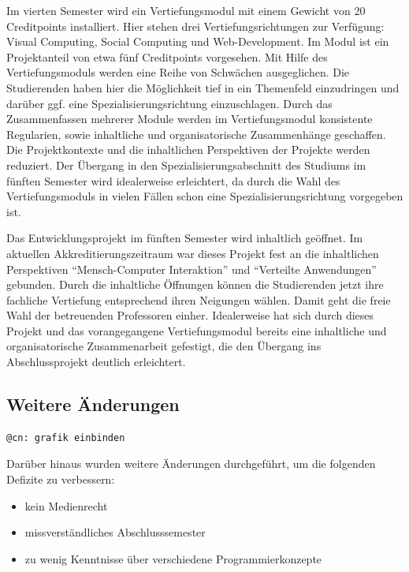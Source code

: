 Im vierten Semester wird ein Vertiefungsmodul mit einem Gewicht von 20
Creditpoints installiert. Hier stehen drei Vertiefungsrichtungen zur
Verfügung: Visual Computing, Social Computing und Web-Development. Im
Modul ist ein Projektanteil von etwa fünf Creditpoints vorgesehen. Mit
Hilfe des Vertiefungsmoduls werden eine Reihe von Schwächen
ausgeglichen. Die Studierenden haben hier die Möglichkeit tief in ein
Themenfeld einzudringen und darüber ggf. eine Spezialisierungsrichtung
einzuschlagen. Durch das Zusammenfassen mehrerer Module werden im
Vertiefungsmodul konsistente Regularien, sowie inhaltliche und
organisatorische Zusammenhänge geschaffen. Die Projektkontexte und die
inhaltlichen Perspektiven der Projekte werden reduziert. Der Übergang in
den Spezialisierungsabschnitt des Studiums im fünften Semester wird
idealerweise erleichtert, da durch die Wahl des Vertiefungsmoduls in
vielen Fällen schon eine Spezialisierungsrichtung vorgegeben ist.

Das Entwicklungsprojekt im fünften Semester wird inhaltlich geöffnet. Im
aktuellen Akkreditierungszeitraum war dieses Projekt fest an die
inhaltlichen Perspektiven ``Mensch-Computer Interaktion'' und
``Verteilte Anwendungen'' gebunden. Durch die inhaltliche Öffnungen
können die Studierenden jetzt ihre fachliche Vertiefung entsprechend
ihren Neigungen wählen. Damit geht die freie Wahl der betreuenden
Professoren einher. Idealerweise hat sich durch dieses Projekt und das
vorangegangene Vertiefungsmodul bereits eine inhaltliche und
organisatorische Zusammenarbeit gefestigt, die den Übergang ins
Abschlussprojekt deutlich erleichtert.

\subsection{Weitere Änderungen}\label{weitere-uxe4nderungen}

\begin{verbatim}
@cn: grafik einbinden
\end{verbatim}

Darüber hinaus wurden weitere Änderungen durchgeführt, um die folgenden
Defizite zu verbessern:

\begin{itemize}
\tightlist
\item
  kein Medienrecht
\item
  missverständliches Abschlusssemester
\item
  zu wenig Kenntnisse über verschiedene Programmierkonzepte
\end{itemize}

